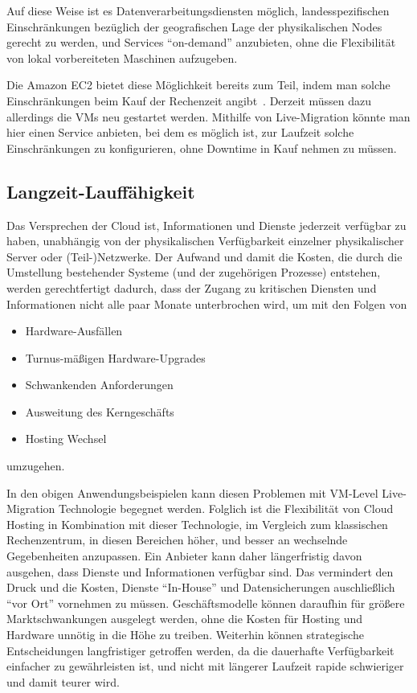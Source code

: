 Auf diese Weise ist es Datenverarbeitungsdiensten möglich,
landesspezifischen Einschränkungen bezüglich der geografischen Lage
der physikalischen Nodes gerecht zu werden, und Services "`on-demand"'
anzubieten, ohne die Flexibilität von lokal vorbereiteten Maschinen
aufzugeben.

Die Amazon EC2 bietet diese Möglichkeit bereits zum Teil, indem man
solche Einschränkungen beim Kauf der Rechenzeit
angibt~\cite{none}. Derzeit müssen dazu allerdings die VMs neu
gestartet werden. Mithilfe von Live-Migration könnte man hier einen
Service anbieten, bei dem es möglich ist, zur Laufzeit solche
Einschränkungen zu konfigurieren, ohne Downtime in Kauf nehmen zu
müssen.

\subsection{Langzeit-Lauffähigkeit}
\label{sec:langz-lauff}
Das Versprechen der Cloud ist, Informationen und Dienste jederzeit
verfügbar zu haben, unabhängig von der physikalischen Verfügbarkeit
einzelner physikalischer Server oder (Teil-)Netzwerke. Der Aufwand und
damit die Kosten, die durch die Umstellung bestehender Systeme (und
der zugehörigen Prozesse) entstehen, werden gerechtfertigt dadurch,
dass der Zugang zu kritischen Diensten und Informationen nicht alle
paar Monate unterbrochen wird, um mit den Folgen von
\begin{itemize}
\item Hardware-Ausfällen
\item Turnus-mäßigen Hardware-Upgrades
\item Schwankenden Anforderungen
\item Ausweitung des Kerngeschäfts
\item Hosting Wechsel
\end{itemize}
umzugehen.

In den obigen Anwendungsbeispielen kann diesen Problemen mit VM-Level
Live-Migration Technologie begegnet werden. Folglich ist die
Flexibilität von Cloud Hosting in Kombination mit dieser Technologie,
im Vergleich zum klassischen Rechenzentrum, in diesen Bereichen höher,
und besser an wechselnde Gegebenheiten anzupassen. Ein Anbieter kann
daher längerfristig davon ausgehen, dass Dienste und Informationen
verfügbar sind. Das vermindert den Druck und die Kosten, Dienste
"`In-House"' und Datensicherungen auschließlich "`vor Ort"' vornehmen
zu müssen. Geschäftsmodelle können daraufhin für größere
Marktschwankungen ausgelegt werden, ohne die Kosten für Hosting und
Hardware unnötig in die Höhe zu treiben. Weiterhin können strategische
Entscheidungen langfristiger getroffen werden, da die dauerhafte
Verfügbarkeit einfacher zu gewährleisten ist, und nicht mit längerer
Laufzeit rapide schwieriger und damit teurer wird.


